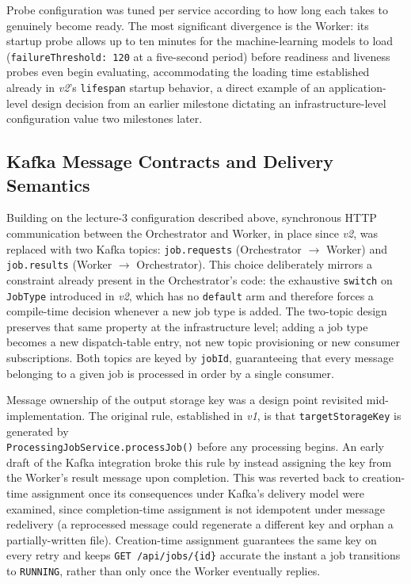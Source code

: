 \documentclass[twoside]{supsistudent}
\begin{document}
Probe configuration was tuned per service according to how long each takes to genuinely become ready. The most significant divergence is the Worker: its startup probe allows up to ten minutes for the machine-learning models to load (\texttt{failureThreshold: 120} at a five-second period) before readiness and liveness probes even begin evaluating, accommodating the loading time established already in \emph{v2}'s \texttt{lifespan} startup behavior, a direct example of an application-level design decision from an earlier milestone dictating an infrastructure-level configuration value two milestones later.

\subsection{Kafka Message Contracts and Delivery Semantics}
Building on the lecture-3 configuration described above, synchronous HTTP communication between the Orchestrator and Worker, in place since \emph{v2}, was replaced with two Kafka topics: \texttt{job.requests} (Orchestrator $\to$ Worker) and \texttt{job.results} (Worker $\to$ Orchestrator). This choice deliberately mirrors a constraint already present in the Orchestrator's code: the exhaustive \texttt{switch} on \texttt{JobType} introduced in \emph{v2}, which has no \texttt{default} arm and therefore forces a compile-time decision whenever a new job type is added. The two-topic design preserves that same property at the infrastructure level; adding a job type becomes a new dispatch-table entry, not new topic provisioning or new consumer subscriptions. Both topics are keyed by \texttt{jobId}, guaranteeing that every message belonging to a given job is processed in order by a single consumer.

Message ownership of the output storage key was a design point revisited mid-implementation. The original rule, established in \emph{v1}, is that \texttt{targetStorageKey} is generated by \\ \texttt{ProcessingJobService.processJob()} before any processing begins. An early draft of the Kafka integration broke this rule by instead assigning the key from the Worker's result message upon completion. This was reverted back to creation-time assignment once its consequences under Kafka's delivery model were examined, since completion-time assignment is not idempotent under message redelivery (a reprocessed message could regenerate a different key and orphan a partially-written file). Creation-time assignment guarantees the same key on every retry and keeps \texttt{GET /api/jobs/\{id\}} accurate the instant a job transitions to \texttt{RUNNING}, rather than only once the Worker eventually replies.
\end{document}
